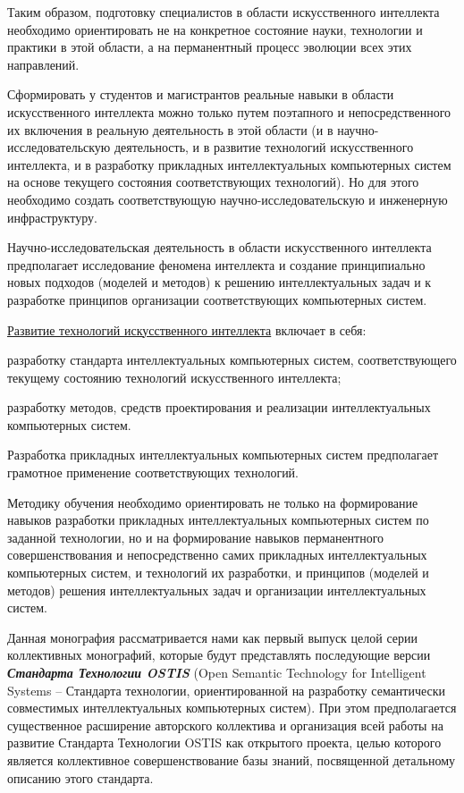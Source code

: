 {	Таким образом, подготовку специалистов в области искусственного интеллекта необходимо ориентировать не на конкретное состояние науки, технологии и практики в этой области, а на перманентный процесс эволюции всех этих направлений.
	
	Сформировать у студентов и магистрантов реальные навыки в области искусственного интеллекта можно только путем поэтапного и непосредственного их включения в  реальную деятельность в этой области (и в научно-исследовательскую деятельность, и в развитие технологий искусственного интеллекта, и в разработку прикладных интеллектуальных компьютерных систем на основе текущего состояния соответствующих технологий). Но для этого необходимо создать соответствующую научно-исследовательскую и инженерную инфраструктуру.
	
	Научно-исследовательская деятельность  в области искусственного интеллекта предполагает исследование феномена интеллекта и создание принципиально новых подходов (моделей и методов) к решению интеллектуальных задач и к разработке принципов организации соответствующих компьютерных систем.
	
	\uline{Развитие технологий искусственного интеллекта} включает в себя:
	\begin{scnitemize}
		\item разработку стандарта интеллектуальных компьютерных систем, соответствующего текущему состоянию технологий искусственного интеллекта;
		\item разработку методов, средств проектирования и реализации интеллектуальных компьютерных систем.
	\end{scnitemize}
	
	Разработка прикладных интеллектуальных компьютерных систем  предполагает грамотное применение соответствующих технологий.
	
	
	Методику обучения необходимо ориентировать не только на формирование навыков разработки прикладных интеллектуальных компьютерных систем по заданной технологии, но и на формирование навыков перманентного совершенствования  и непосредственно самих прикладных интеллектуальных компьютерных систем, и технологий их разработки, и принципов (моделей и методов) решения интеллектуальных задач и организации интеллектуальных систем.


Данная монография рассматривается нами как первый выпуск целой серии коллективных монографий, которые будут представлять последующие версии \textbf{\textit{Стандарта Технологии OSTIS}} (Open Semantic Technology for Intelligent Systems -- Стандарта технологии, ориентированной на разработку семантически совместимых интеллектуальных компьютерных систем). При этом предполагается существенное расширение авторского коллектива и организация всей работы на развитие Стандарта Технологии OSTIS как открытого проекта, целью которого является коллективное совершенствование базы знаний, посвященной детальному описанию этого стандарта.

}
